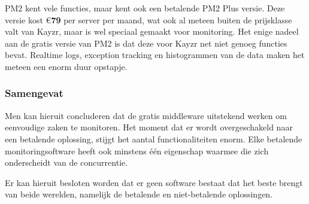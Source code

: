 PM2 kent vele functies, maar kent ook een betalende PM2 Plus versie. Deze versie kost \euro\textbf{79} per server per maand, wat ook al meteen buiten de prijsklasse valt van Kayzr, maar is wel speciaal gemaakt voor monitoring. Het enige nadeel aan de gratis versie van PM2 is dat deze voor Kayzr net niet genoeg functies bevat. Realtime logs, exception tracking en histogrammen van de data maken het meteen een enorm duur opstapje.

\subsubsection{Samengevat}
\label{sec:samengevat}
 
Men kan hieruit concluderen dat de gratis middleware uitstekend werken om eenvoudige zaken te monitoren. Het moment dat er wordt overgeschakeld naar een betalende oplossing, stijgt het aantal functionaliteiten enorm. Elke betalende monitoringsoftware heeft ook minstens één eigenschap waarmee die zich onderscheidt van de concurrentie. 

Er kan hieruit besloten worden dat er geen software bestaat dat het beste brengt van beide werelden, namelijk de betalende en niet-betalende oplossingen.





 
